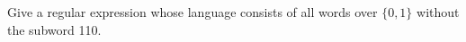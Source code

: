 \subsection{}

Give a regular expression whose language consists of all words over $\{0,1\}$ without the subword 110.
